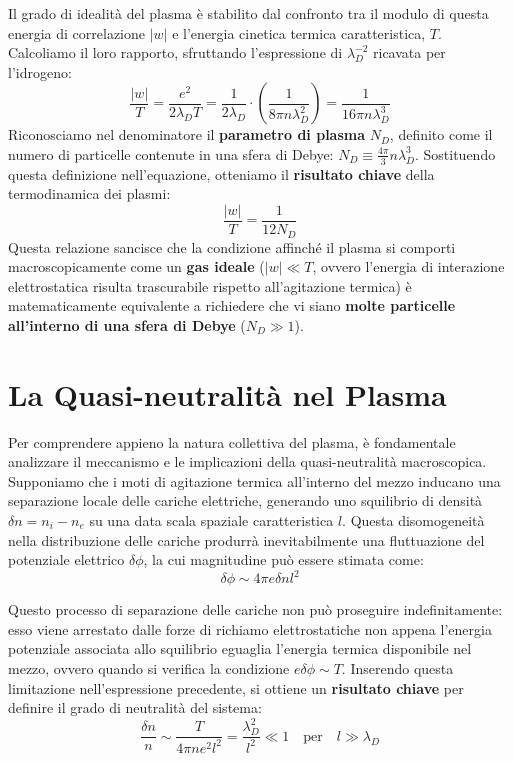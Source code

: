 Il grado di idealità del plasma è stabilito dal confronto tra il modulo di questa energia di correlazione $\vert{}w\vert{}$ e l'energia cinetica termica caratteristica, $T$. Calcoliamo il loro rapporto, sfruttando l'espressione di $\lambda_D^{-2}$ ricavata per l'idrogeno:
\begin{equation}
\frac{|w|}{T} = \frac{e^2}{2\lambda_D T} = \frac{1}{2\lambda_D} \cdot \left( \frac{1}{8\pi n \lambda_D^2} \right) = \frac{1}{16\pi n \lambda_D^3}
\end{equation}
Riconosciamo nel denominatore il \textbf{parametro di plasma} $N_D$, definito come il numero di particelle contenute in una sfera di Debye: $N_D \equiv \frac{4\pi}{3} n \lambda_D^3$. Sostituendo questa definizione nell'equazione, otteniamo il \textbf{risultato chiave} della termodinamica dei plasmi:
\begin{equation}
\frac{|w|}{T} = \frac{1}{12 N_D}
\end{equation}
Questa relazione sancisce che la condizione affinché il plasma si comporti macroscopicamente come un \textbf{gas ideale} ($\vert{}w\vert{} \ll T$, ovvero l'energia di interazione elettrostatica risulta trascurabile rispetto all'agitazione termica) è matematicamente equivalente a richiedere che vi siano \textbf{molte particelle all'interno di una sfera di Debye} ($N_D \gg 1$).

\section{La Quasi-neutralità nel Plasma}

Per comprendere appieno la natura collettiva del plasma, è fondamentale analizzare il meccanismo e le implicazioni della quasi-neutralità macroscopica. Supponiamo che i moti di agitazione termica all'interno del mezzo inducano una separazione locale delle cariche elettriche, generando uno squilibrio di densità $\delta n = n_i - n_e$ su una data scala spaziale caratteristica $l$. Questa disomogeneità nella distribuzione delle cariche produrrà inevitabilmente una fluttuazione del potenziale elettrico $\delta \phi$, la cui magnitudine può essere stimata come:
\begin{equation}
\delta \phi \sim 4\pi e \delta n l^2
\end{equation}

Questo processo di separazione delle cariche non può proseguire indefinitamente: esso viene arrestato dalle forze di richiamo elettrostatiche non appena l'energia potenziale associata allo squilibrio eguaglia l'energia termica disponibile nel mezzo, ovvero quando si verifica la condizione $e \delta \phi \sim T$. Inserendo questa limitazione nell'espressione precedente, si ottiene un \textbf{risultato chiave} per definire il grado di neutralità del sistema:
\begin{equation}
\frac{\delta n}{n} \sim \frac{T}{4\pi n e^2 l^2} = \frac{\lambda_D^2}{l^2} \ll 1 \quad \text{per} \quad l \gg \lambda_D
\end{equation}


